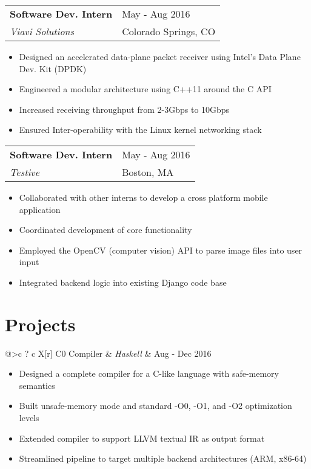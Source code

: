 \documentclass[12pt]{article}
\begin{document}
\begin{tabu}{@{}l X[r]}
  \textbf{Software Dev. Intern} & May - Aug 2016 \\
\emph{Viavi Solutions} & Colorado Springs, CO
\end{tabu}
\vspace{-5pt}

\begin{itemize}
\itemsep-2pt
\item Designed an accelerated data-plane packet receiver using Intel's Data Plane Dev. Kit (DPDK) 
\item Engineered a modular architecture using C++11 around the C API
\item Increased receiving throughput from 2-3Gbps to 10Gbps
\item Ensured Inter-operability with the Linux kernel networking stack
\end{itemize}

\begin{tabu}{@{}l X[r]}
  \textbf{Software Dev. Intern} & May - Aug 2016 \\
\emph{Testive} &Boston, MA
\end{tabu}
\vspace{-5pt}

\begin{itemize}
\itemsep-2pt
\item Collaborated with other interns to develop a cross platform mobile application
\item Coordinated development of core functionality
\item Employed the OpenCV (computer vision) API to parse image files into user input
\item Integrated backend logic into existing Django code base
\end{itemize}


\iffalse
\section{Projects}

\begin{tabu}{@{}>{\bfseries}c ? c  X[r]}
C0 Compiler & \emph{Haskell} & Aug - Dec 2016
\end{tabu}
\vspace{-5pt}

\begin{itemize}
\itemsep-2pt
\item Designed a complete compiler for a C-like language with safe-memory semantics
\item Built unsafe-memory mode and standard -O0, -O1, and -O2 optimization levels
\item Extended compiler to support LLVM textual IR as output format
\item Streamlined pipeline to target multiple backend architectures (ARM, x86-64)
\end{itemize}
\end{document}

